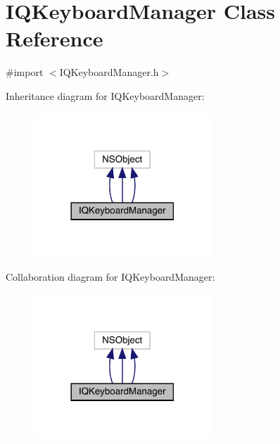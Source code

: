\hypertarget{interface_i_q_keyboard_manager}{}\section{I\+Q\+Keyboard\+Manager Class Reference}
\label{interface_i_q_keyboard_manager}


{\ttfamily \#import $<$I\+Q\+Keyboard\+Manager.\+h$>$}



Inheritance diagram for I\+Q\+Keyboard\+Manager\+:\nopagebreak
\begin{figure}[H]
\begin{center}
\leavevmode
\includegraphics[width=189pt]{interface_i_q_keyboard_manager__inherit__graph}
\end{center}
\end{figure}


Collaboration diagram for I\+Q\+Keyboard\+Manager\+:\nopagebreak
\begin{figure}[H]
\begin{center}
\leavevmode
\includegraphics[width=189pt]{interface_i_q_keyboard_manager__coll__graph}
\end{center}
\end{figure}
